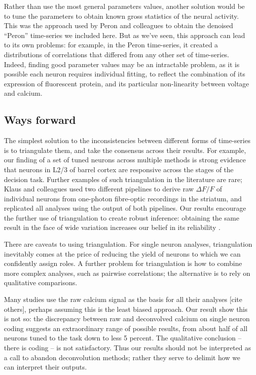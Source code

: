 \documentclass[a4paper,11pt]{article}
\begin{document}
Rather than use the most general parameters values, another solution would be to tune the parameters to obtain known gross statistics of the neural activity. This was the approach used by Peron and colleagues \citep{Peron2015-kd} to obtain the denoised “Peron” time-series we included here. But as we’ve seen, this approach can lead to its own problems: for example, in the Peron time-series, it created a distributions of correlations that differed from any other set of time-series. Indeed, finding good parameter values may be an intractable problem, as it is possible each neuron requires individual fitting, to reflect the combination of its expression of fluorescent protein, and its particular non-linearity between voltage and calcium. 

\subsection{Ways forward}

The simplest solution to the inconsistencies between different forms of time-series is to triangulate them, and take the consensus across their results. For example, our finding of a set of tuned neurons across multiple methods is strong evidence that neurons in L2/3 of barrel cortex are responsive across the stages of the decision task. Further examples of such triangulation in the literature are rare; Klaus and colleagues \citep{Klaus2017-wn} used two different pipelines to derive raw $\Delta F/F$ of individual neurons from one-photon fibre-optic recordings in the striatum, and replicated all analyses using the output of both pipelines. Our results encourage the further use of triangulation to create robust inference: obtaining the same result in the face of wide variation increases our belief in its reliability \citep{Munafo2018-ab}.

There are caveats to using triangulation. For single neuron analyses, triangulation inevitably comes at the price of reducing the yield of neurons to which we can confidently assign roles. A further problem for triangulation is how to combine more complex analyses, such as pairwise correlations; the alternative is to rely on qualitative comparisons.

Many studies use the raw calcium signal as the basis for all their analyses \citep{Harvey2012-bh, Huber2012-mi} [cite others], perhaps assuming this is the least biased approach. Our result show this is not so: the discrepancy between raw and deconvolved calcium on single neuron coding suggests an extraordinary range of possible results, from about half of all neurons tuned to the task down to less 5 percent. The qualitative conclusion -- there is coding -- is not satisfactory. Thus our results should not be interpreted as a call to abandon deconvolution methods; rather they serve to delimit how we can interpret their outputs. 
\end{document}
